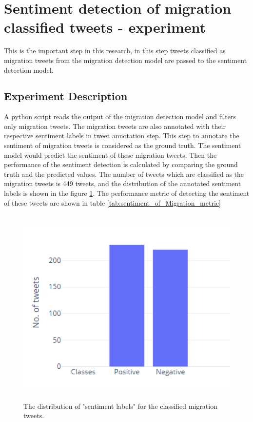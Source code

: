\section{Sentiment detection of migration classified tweets - experiment}

This is the important step in this research, in this step tweets classified as migration tweets from the migration detection model are passed to the sentiment detection model.

\subsection{Experiment Description}

A python script reads the output of the migration detection model and filters only migration tweets. The migration tweets are also annotated with their respective sentiment labels in tweet annotation step. This step to annotate the sentiment of migration tweets is considered as the ground truth. The sentiment model would predict the sentiment of these migration tweets. Then the performance of the sentiment detection is calculated by comparing the ground truth and the predicted values. The number of tweets which are classified as the migration tweets is 449 tweets, and the distribution of the annotated sentiment labels is shown in the figure \ref{fig:sent_migration_distribution}. The performance metric of detecting the sentiment of these tweets are shown in table \ref{tab:sentiment_of_Migration_metric}

 

\begin{figure}
	\centering
	\includegraphics[width=12cm\linewidth,height=10cm]{thesis_template/images/sentiment_of_migration_tweets.png}
	\caption{ The distribution of "sentiment labels" for the classified migration tweets.}
	\label{fig:sent_migration_distribution}
\end{figure}



